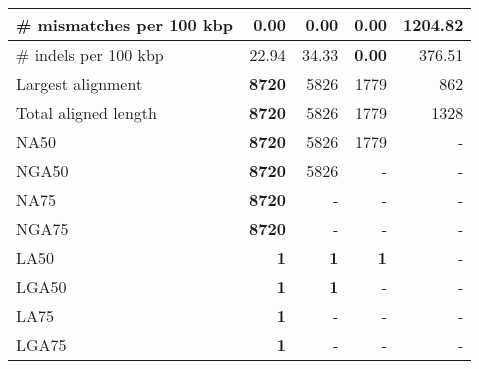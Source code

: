 \documentclass[12pt,a4paper]{article}
\begin{document}
\begin{table}[ht]
\begin{center}
\begin{tabular}{|l*{4}{|r}|}
\# mismatches per 100 kbp & {\bf 0.00} & {\bf 0.00} & {\bf 0.00} & 1204.82 \\ \hline
\# indels per 100 kbp & 22.94 & 34.33 & {\bf 0.00} & 376.51 \\ \hline
Largest alignment & {\bf 8720} & 5826 & 1779 & 862 \\ \hline
Total aligned length & {\bf 8720} & 5826 & 1779 & 1328 \\ \hline
NA50 & {\bf 8720} & 5826 & 1779 & - \\ \hline
NGA50 & {\bf 8720} & 5826 & - & - \\ \hline
NA75 & {\bf 8720} & - & - & - \\ \hline
NGA75 & {\bf 8720} & - & - & - \\ \hline
LA50 & {\bf 1} & {\bf 1} & {\bf 1} & - \\ \hline
LGA50 & {\bf 1} & {\bf 1} & - & - \\ \hline
LA75 & {\bf 1} & - & - & - \\ \hline
LGA75 & {\bf 1} & - & - & - \\ \hline
\end{tabular}
\end{center}
\end{table}
\end{document}
